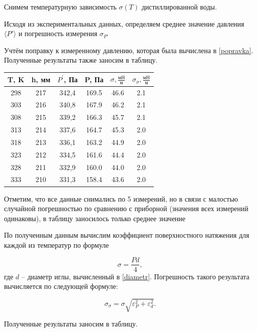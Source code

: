 \documentclass[12pt,a4paper]{article}
\begin{document}
Снимем температурную зависимость $ \sigma(T) $ дистиллированной воды. 

Исходя из экспериментальных данных, определяем среднее значение давления $ \langle P' \rangle $ и погрешность измерения $ \sigma_{P'} $ 

Учтём поправку к измеренному давлению, которая была вычислена в \ref{popravka}. Полученные результаты также заносим в таблицу.


\begin{center}
\begin{tabular}{|c|c|c|c|c|c|}
\hline 
T, K & h, мм & $P^{'}$, Па & P, Па & $\sigma, \frac{\text{мН}}{\text{м}}$ & $\sigma_{\sigma},\frac{\text{мН}}{\text{м}} $ \\ 
\hline 
298 & 217 & 342,4 & 169.5 & 46.6 & 2.1 \\ 
\hline 
303 & 216 & 340,8 & 167.9 & 46.2 & 2.1 \\ 
\hline 
308 & 215 & 339,2 & 166.3 & 45.7 & 2.1 \\ 
\hline 
313 & 214 & 337,6 & 164.7 & 45.3 & 2.0 \\ 
\hline 
318 & 213 & 336,1 & 163.2 & 44.9 & 2.0 \\ 
\hline 
323 & 212 & 334,5 & 161.6 & 44.4 & 2.0 \\ 
\hline 
328 & 211 & 332,9 & 160.0 & 44.0 & 2.0 \\ 
\hline 
333 & 210 & 331,3 & 158.4 & 43.6 & 2.0 \\ 
\hline 
\end{tabular} 
\end{center}

Отметим, что все данные снимались по 5 измерений, но в связи с малостью случайной погрешностью по сравнению с приборной (значения всех измерений одинаковы), в таблицу заносилось только среднее значение

По полученным данным вычислим коэффициент поверхностного натяжения для каждой из температур по формуле

\begin{equation}\label{sigma}
\sigma = \frac{Pd}{4},
\end{equation}
где $ d $ -- диаметр иглы, вычисленный в \ref{diametr}. Погрешность такого результата вычисляется по следующей формуле:

\begin{equation}\label{otn_pogr}
\sigma_\sigma = \sigma\sqrt{\varepsilon^2_P + \varepsilon^2_d}.
\end{equation}

Полученные результаты заносим в таблицу.
\end{document}
